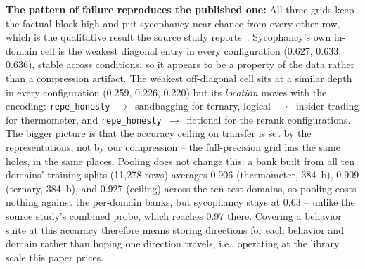 \textbf{The pattern of failure reproduces the published one:} All three
grids keep the factual block high and put sycophancy near chance from
every other row, which is the qualitative result the source study
reports~\cite{ying2026spectrum}. Sycophancy's own in-domain cell is the
weakest diagonal entry in every configuration (0.627, 0.633, 0.636),
stable across conditions, so it appears to be a property of the data
rather than a compression artifact. The weakest off-diagonal cell sits
at a similar depth in every configuration (0.259, 0.226, 0.220) but
its \emph{location} moves with the encoding:
\texttt{repe\_honesty}~$\to$~sandbagging for ternary,
logical~$\to$~insider trading for thermometer, and
\texttt{repe\_honesty}~$\to$~fictional for the rerank
configurations. The bigger picture is that the accuracy ceiling on
transfer is set by the representations, not by our compression -- the
full-precision grid has the same holes, in the same places. Pooling
does not change this: a bank built from all ten domains' training
splits (11{,}278 rows) averages 0.906 (thermometer, 384~b), 0.909
(ternary, 384~b), and 0.927 (ceiling) across the ten test domains, so
pooling costs nothing against the per-domain banks, but sycophancy
stays at 0.63 -- unlike the source study's combined probe, which
reaches 0.97 there. Covering
a behavior suite at this accuracy therefore means storing directions
for each behavior and domain rather than hoping one direction
travels, i.e., operating at the library scale this paper
prices.

